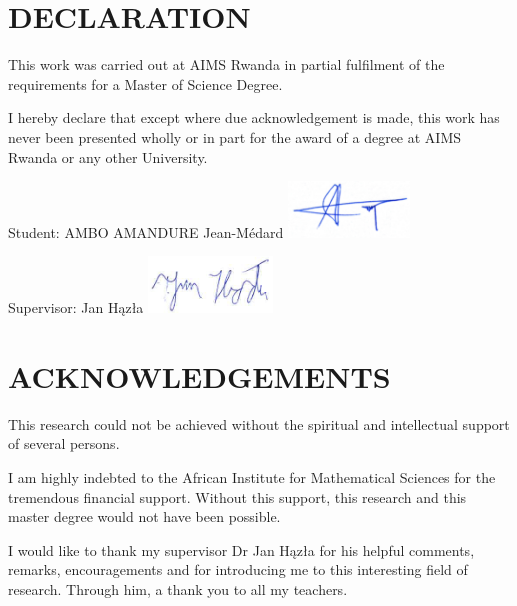 \chapter*{DECLARATION}
This work was carried out at AIMS Rwanda in partial fulfilment of the requirements for a Master of Science Degree.

I hereby declare that except where due acknowledgement is made, this work has never been presented wholly or in part for the award of a degree at AIMS Rwanda or any other University.

\vspace{1.5cm}
Student: AMBO AMANDURE Jean-Médard  \includegraphics[height=1.5cm]{images/signatureAMBO.jpg}

\vspace{1.5cm}

Supervisor: Jan Hązła \includegraphics[height=1.5cm]{images/jh_signature.png}


\newpage

\chapter*{ACKNOWLEDGEMENTS}


This research could not be achieved without the spiritual and intellectual support of several persons.

I am highly indebted to the African Institute for Mathematical Sciences for  the tremendous  financial support. Without this support,  this research and this master degree would not have been possible.

I would like to thank my supervisor Dr Jan H{\k{a}}z{\l}a for his helpful comments, remarks, encouragements and for introducing me to this interesting field of research. Through him, a thank you to all my teachers.

